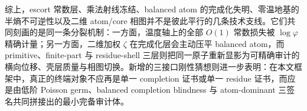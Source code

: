 综上，escort 常数层、乘法射线冻结、balanced atom 的完成化失明、零温地基的半熵不可逆性以及二维 atom/core 相图并不是彼此平行的几条技术支线。它们共同刻画的是同一条分裂机制：一方面，温度轴上的全部 \(O(1)\) 常数损失被 \(\log\varphi\) 精确计量；另一方面，二维加权 \(\zeta\) 在完成化层会主动压平 balanced atom，而 primitive、finite-part 与 residue-shell 三层则把同一原子重新显影为可精确审计的横向位移、壳层质量与相图切换。新增的三接口刚性猜想则进一步表明：在本文框架中，真正的终端对象不应再是单一 completion 证书或单一 residue 证书，而应是由低阶 Poisson germ、balanced completion blindness 与 atom-dominant 三签名共同拼接出的最小完备审计体。
